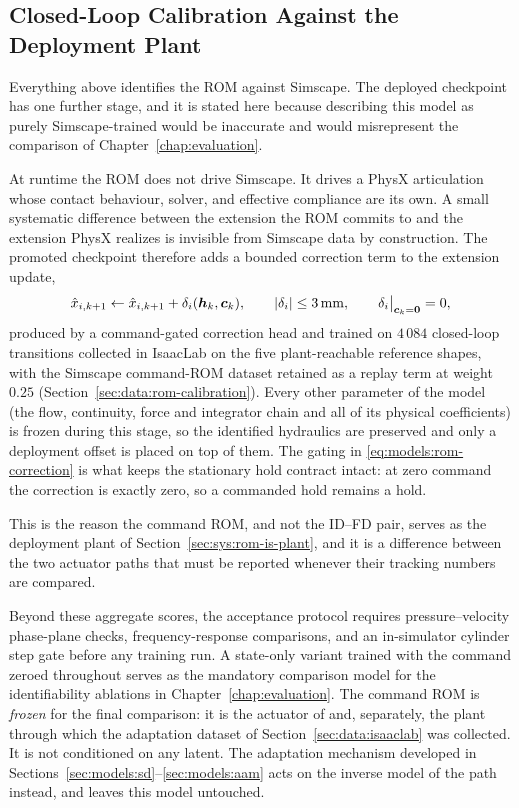 \subsection{Closed-Loop Calibration Against the Deployment Plant}
\label{sec:models:rom-calibration}

Everything above identifies the ROM against Simscape. The deployed
checkpoint has one further stage, and it is stated here because
describing this model as purely Simscape-trained would be inaccurate and
would misrepresent the comparison of Chapter~\ref{chap:evaluation}.

At runtime the ROM does not drive Simscape. It drives a PhysX
articulation whose contact behaviour, solver, and effective compliance
are its own. A small systematic difference between the extension the ROM
commits to and the extension PhysX realizes is invisible from Simscape
data by construction. The promoted checkpoint therefore adds a bounded
correction term to the extension update,
%
\begin{equation}
  \label{eq:models:rom-correction}
  \hat{x}_{i,k+1} \leftarrow \hat{x}_{i,k+1}
    + \delta_i(\bm{h}_k, \bm{c}_k),
  \qquad
  |\delta_i| \leq \unit[3]{mm},
  \qquad
  \delta_i\big|_{\bm{c}_k = \bm{0}} = 0,
\end{equation}
%
produced by a command-gated correction head and trained on
$4\,084$ closed-loop transitions collected in IsaacLab on the five
plant-reachable reference shapes, with the Simscape command-ROM dataset
retained as a replay term at weight $0.25$
(Section~\ref{sec:data:rom-calibration}). Every other parameter of the model
(the flow, continuity, force and integrator chain and all of its physical
coefficients) is frozen during this stage, so the
identified hydraulics are preserved and only a deployment offset is
placed on top of them. The gating in
\eqref{eq:models:rom-correction} is what keeps the stationary hold
contract intact: at zero command the correction is exactly zero, so a
commanded hold remains a hold.

This is the reason the command ROM, and not the ID--FD pair, serves as
the deployment plant of Section~\ref{sec:sys:rom-is-plant}, and it is a
difference between the two actuator paths that must be reported whenever
their tracking numbers are compared.

Beyond these aggregate scores, the acceptance protocol requires
pressure--velocity phase-plane checks, frequency-response comparisons, and
an in-simulator cylinder step gate before any \ppoROM{} training run. A
state-only variant trained with the command zeroed throughout serves as the
mandatory comparison model for the identifiability ablations in
Chapter~\ref{chap:evaluation}. The command ROM is \emph{frozen} for the
final comparison: it is the actuator of \ppoROM{} and, separately, the plant
through which the adaptation dataset of Section~\ref{sec:data:isaaclab} was
collected. It is not conditioned on any latent. The adaptation mechanism
developed in Sections~\ref{sec:models:sd}--\ref{sec:models:aam} acts on the
inverse model of the \ppoIDFD{} path instead, and leaves this model
untouched.

